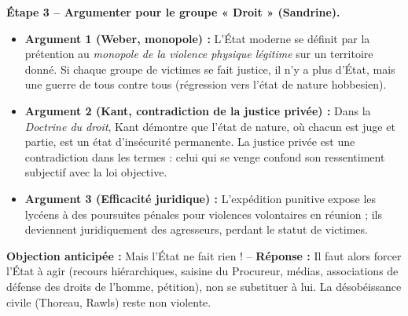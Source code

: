 \documentclass[11pt]{article}
\begin{document}
\begin{exoresolu}
\textbf{Étape 3 -- Argumenter pour le groupe « Droit » (Sandrine).}
\begin{itemize}
\item \textbf{Argument 1 (Weber, monopole) :} L'État moderne se définit par la prétention au \emph{monopole de la violence physique légitime} sur un territoire donné. Si chaque groupe de victimes se fait justice, il n'y a plus d'État, mais une guerre de tous contre tous (régression vers l'état de nature hobbesien).
\item \textbf{Argument 2 (Kant, contradiction de la justice privée) :} Dans la \emph{Doctrine du droit}, Kant démontre que l'état de nature, où chacun est juge et partie, est un état d'insécurité permanente. La justice privée est une contradiction dans les termes : celui qui se venge confond son ressentiment subjectif avec la loi objective.
\item \textbf{Argument 3 (Efficacité juridique) :} L'expédition punitive expose les lycéens à des poursuites pénales pour violences volontaires en réunion ; ils deviennent juridiquement des agresseurs, perdant le statut de victimes.
\end{itemize}
\textbf{Objection anticipée :} \guillemotleft Mais l'État ne fait rien ! \guillemotright -- \textbf{Réponse :} Il faut alors forcer l'État à agir (recours hiérarchiques, saisine du Procureur, médias, associations de défense des droits de l'homme, pétition), non se substituer à lui. La désobéissance civile (Thoreau, Rawls) reste non violente.


\end{exoresolu}
\end{document}
